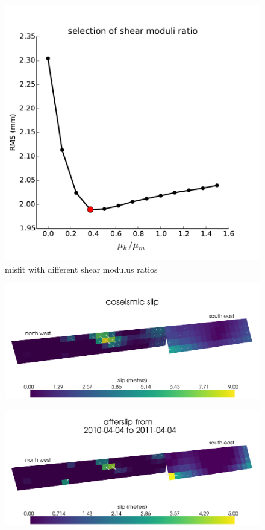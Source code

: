 \documentclass[12pt]{article}
\begin{document}
\begin{figure}
\includegraphics[scale=1.0]{Figures/shear_ratio}
\centering 
\caption{misfit with different shear modulus ratios}
\label{fig:ShearModulusRatio}
\end{figure} 

\begin{figure}
\includegraphics[scale=0.1]{Figures/final_coseismic}
\centering 
\caption{}
\label{fig:FinalCoseismic}
\end{figure} 

\begin{figure}
\includegraphics[scale=0.1]{Figures/final_afterslip_0-1}
\centering 
\caption{}
\label{fig:FinalAfterslip1}
\end{figure} 
\end{document}
